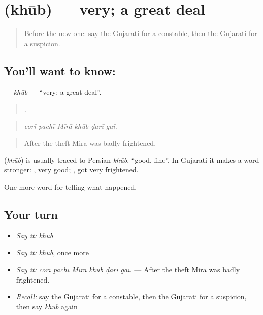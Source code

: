 \section[\texorpdfstring{\gu{ખૂબ} (khūb)}{ખૂબ (khūb)}]{ (khūb) — very; a great deal}

\label{lesson:GU-C286-khub}



\begin{quote}
Before the new one: say the Gujarati for a constable, then the Gujarati for a suspicion.
\end{quote}

\subsection*{You'll want to know: }
\textbf{} — \emph{khūb} — \textquotedblleft{}very; a great deal\textquotedblright{}.

\begin{quote}
     .
\end{quote}

\begin{quote}
\emph{corī pachī Mīrā khūb ḍarī gaī.}
\end{quote}

\begin{quote}
After the theft Mira was badly frightened.
\end{quote}

\begin{cousinweb}
\textbf{} (\emph{khūb}) is usually traced to Persian \emph{khūb}, \textquotedblleft{}good, fine\textquotedblright{}. In Gujarati it makes a word stronger: \textbf{ }, very good; \textbf{  }, got very frightened.
\end{cousinweb}

\begin{grammarlens}[title={What you've built}]
One more word for telling what happened.
\end{grammarlens}

\subsection*{Your turn}
\begin{itemize}
\raggedright
  \item \emph{Say it:} \emph{khūb}
  \item \emph{Say it:} \emph{khūb}, once more
  \item \emph{Say it:} \emph{corī pachī Mīrā khūb ḍarī gaī.} — After the theft Mira was badly frightened.
  \item \emph{Recall:} say the Gujarati for a constable, then the Gujarati for a suspicion, then say \emph{khūb} again
\end{itemize}

